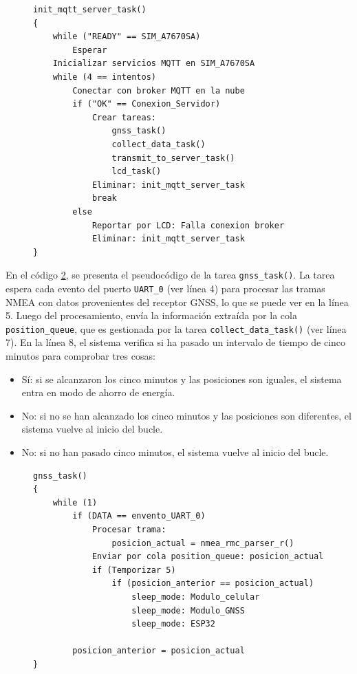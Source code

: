 \begin{figure}[H]
\begin{lstlisting} 
init_mqtt_server_task()
{
	while ("READY" == SIM_A7670SA)
		Esperar
	Inicializar servicios MQTT en SIM_A7670SA
	while (4 == intentos)
		Conectar con broker MQTT en la nube
		if ("OK" == Conexion_Servidor)
			Crear tareas: 
				gnss_task()
				collect_data_task()
				transmit_to_server_task()
				lcd_task()
			Eliminar: init_mqtt_server_task
			break
		else
			Reportar por LCD: Falla conexion broker
			Eliminar: init_mqtt_server_task
}

\end{lstlisting}
\label{cod:init_mqtt_server_task}
\end{figure}
 

En el código \ref{cod:gnss_task}, se presenta el pseudocódigo de la tarea \verb|gnss_task()|. La tarea espera cada evento del puerto \verb|UART_0| (ver línea 4) para procesar las tramas NMEA con datos provenientes del receptor GNSS, lo que se puede ver en la línea 5. Luego del procesamiento, envía la información extraída por la cola \verb|position_queue|, que es gestionada por la tarea \verb|collect_data_task()| (ver línea 7). En la línea 8, el sistema verifica si ha pasado un intervalo de tiempo de cinco minutos para comprobar tres cosas: 

\begin{itemize}
\item Sí: si se alcanzaron los cinco minutos y las posiciones son iguales, el sistema entra en modo de ahorro de energía.
\item No: si no se han alcanzado los cinco minutos y las posiciones son diferentes, el sistema vuelve al inicio del bucle.
\item No: si no han pasado cinco minutos, el sistema vuelve al inicio del bucle.
\end{itemize}



\begin{figure}[H]
\begin{lstlisting}
gnss_task()
{
	while (1)
		if (DATA == envento_UART_0)
			Procesar trama: 
				posicion_actual = nmea_rmc_parser_r()
			Enviar por cola position_queue: posicion_actual
			if (Temporizar 5)
				if (posicion_anterior == posicion_actual)
					sleep_mode: Modulo_celular
					sleep_mode: Modulo_GNSS
					sleep_mode: ESP32
					
		posicion_anterior = posicion_actual
}

\end{lstlisting}
\label{cod:gnss_task}
\end{figure}
 


